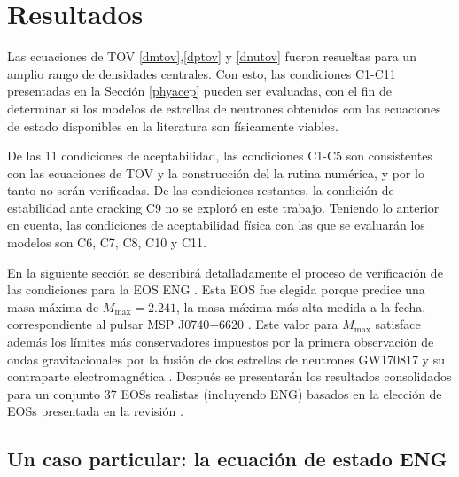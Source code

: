 \chapter{Resultados}

\noindent Las ecuaciones de TOV \eqref{dmtov},\eqref{dptov} y \eqref{dnutov} fueron resueltas para un amplio rango de densidades centrales. Con esto, las condiciones C1-C11 presentadas en la Sección \ref{phyacep} pueden ser evaluadas, con el fin de determinar si los modelos de estrellas de neutrones obtenidos con las ecuaciones de estado disponibles en la literatura son físicamente viables.

De las 11 condiciones de aceptabilidad, las condiciones C1-C5 son consistentes con las ecuaciones de TOV y la construcción del la rutina numérica, y por lo tanto no serán verificadas. De las condiciones restantes, la condición de estabilidad ante cracking C9 no se exploró en este trabajo. Teniendo lo anterior en cuenta, las condiciones de aceptabilidad física con las que se evaluarán los modelos son C6, C7, C8, C10 y C11.


En la siguiente sección se describirá detalladamente el proceso de verificación de las condiciones para la EOS ENG \cite{Engvik1994}. Esta EOS fue elegida porque predice una masa máxima de $M_{\text{max}}= 2.241$, la masa máxima más alta medida a la fecha, correspondiente al pulsar MSP J0740+6620 \cite{Cromartie2019}. Este valor para $M_{\text{max}}$ satisface además los límites más conservadores impuestos por la primera observación de ondas gravitacionales por la fusión de dos estrellas de neutrones GW170817 y su contraparte electromagnética \cite{Rezzolla2017,Radice2018,Ruiz2018,Shibata2019}. Después se presentarán los resultados consolidados para un conjunto 37 EOSs realistas (incluyendo ENG) basados en la elección de EOSs presentada en la revisión \cite{Ozel2016}.

\section{Un caso particular: la ecuación de estado ENG}

